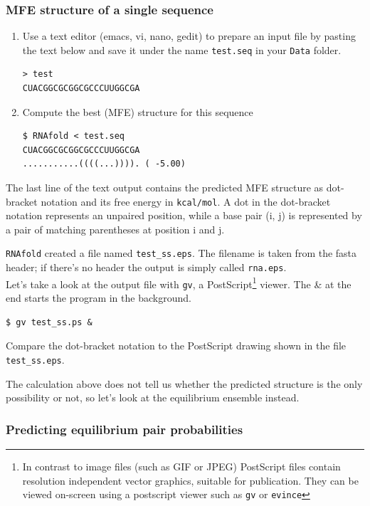 \documentclass[a4paper]{article}
\newcommand{\frametitle}[1]{\subsubsection{#1}}
\begin{document}
\frametitle{MFE structure of a single sequence}

\begin{enumerate}
\item Use a text editor (emacs, vi, nano, gedit) to prepare an input file by pasting the text 
below and save it under the name \texttt{test.seq} in your \texttt{Data} folder.
\begin{verbatim}
> test
CUACGGCGCGGCGCCCUUGGCGA
\end{verbatim}
\item Compute the best (MFE) structure for this sequence
\begin{verbatim}
$ RNAfold < test.seq
CUACGGCGCGGCGCCCUUGGCGA
...........((((...)))). ( -5.00)
\end{verbatim}%
\end{enumerate}

\noindent
The last line of the text output contains the predicted MFE structure as dot-bracket notation
and its free energy in \texttt{kcal/mol}. A dot in the dot-bracket notation represents an unpaired
position, while a base pair (i, j) is represented by a pair of matching parentheses at position
i and j.

\texttt{RNAfold} created a file named \texttt{test\_ss.eps}. The filename is taken from the fasta header; if there's no header the output is simply called \texttt{rna.eps}.\\
Let's take a look at the output file with \texttt{gv}, a PostScript\footnote{In contrast to
  image files (such as GIF or JPEG) PostScript files contain resolution
  independent vector graphics, suitable for publication. They can be
  viewed on-screen using a postscript viewer such as \texttt{gv} or
  \texttt{evince}} viewer. The \& at the end starts the program in the background.
\begin{verbatim}
$ gv test_ss.ps & 
\end{verbatim}
\noindent	
Compare the dot-bracket notation to the PostScript
drawing shown in the file \texttt{test\_ss.eps}.

The calculation above does not tell us whether the predicted structure is
the only possibility or not, so let's look at the equilibrium ensemble instead.
\frametitle{Predicting equilibrium pair probabilities}
\end{document}

